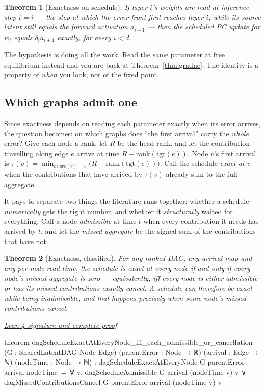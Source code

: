 \documentclass[11pt]{article}
\newtheorem{theorem}{Theorem}[section]
\newcommand{\leancommit}{f3a31db36bb2f944312ee31c1d86c2758109e83a}
\newcommand{\leansignaturelink}[2]{%
  \par\Needspace{0.3\textheight}\smallskip\noindent
  \href{https://github.com/zariuq/MeTTapedia/blob/\leancommit/#1\#L#2}{%
    \scriptsize\itshape Lean 4 signature and complete proof}\par\nobreak}
\begin{document}
\begin{theorem}[Exactness on schedule]\label{thm:zil}
If layer $i$'s weights are read at inference step $t = i$ --- the step at which the error
front first reaches layer $i$, while its source latent still equals the forward
activation $a_{i+1}$ --- then the scheduled PC update for $w_i$ equals $\delta_i a_{i+1}$
exactly, for every $i < d$.
\end{theorem}

The hypothesis is doing all the work. Read the same parameter at free equilibrium
instead and you are back at Theorem~\ref{thm:gradne}. The identity is a property of
\emph{when} you look, not of the fixed point.

\subsection{Which graphs admit one}

Since exactness depends on reading each parameter exactly when its error arrives, the
question becomes: on which graphs does ``the first arrival'' carry the \emph{whole}
error? Give each node a rank, let $R$ be the head rank, and let the contribution
travelling along edge $e$ arrive at time $R - \mathrm{rank}(\mathrm{tgt}(e))$. Node $v$'s
first arrival is $\tau(v) = \min_{e\,:\,\mathrm{src}(e)=v}\bigl(R -
\mathrm{rank}(\mathrm{tgt}(e))\bigr)$. Call the schedule \emph{exact at $v$} when the
contributions that have arrived by $\tau(v)$ already sum to the full aggregate.

It pays to separate two things the literature runs together: whether a schedule
\emph{numerically} gets the right number, and whether it \emph{structurally} waited for
everything. Call a node \emph{admissible} at time $t$ when every contribution it needs
has arrived by $t$, and let the \emph{missed aggregate} be the signed sum of the
contributions that have not.

\begin{theorem}[Exactness, classified]\label{thm:signed}
For any ranked DAG, any arrival map and any per-node read time, the schedule is exact at
every node if and only if every node's missed aggregate is zero --- equivalently, iff
every node is either admissible or has its missed contributions exactly cancel. A
schedule can therefore be exact while being inadmissible, and that happens precisely
when some node's missed contributions cancel.
\end{theorem}

\leansignaturelink{lean/mettapedia/Mettapedia/MachineLearning/NeuralNetworks/%
PredictiveCoding/DAGScheduleExactness.lean}{218}
\begin{leansignature}
theorem dagScheduleExactAtEveryNode_iff_each_admissible_or_cancellation
    (G : SharedLatentDAG Node Edge) (parentError : Node → ℝ)
    (arrival : Edge → ℕ) (nodeTime : Node → ℕ) :
    dagScheduleExactAtEveryNode G parentError arrival nodeTime ↔
      ∀ v,
        dagScheduleAdmissible G arrival (nodeTime v) v ∨
          dagMissedContributionsCancel G parentError arrival (nodeTime v) v
\end{leansignature}
\end{document}
